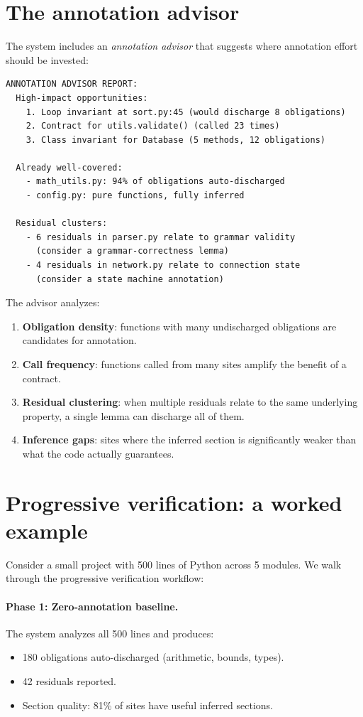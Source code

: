 \documentclass[11pt]{report}
\theoremstyle{definition}
\theoremstyle{plain}
\begin{document}
\section{The annotation advisor}

The system includes an \emph{annotation advisor} that suggests where
annotation effort should be invested:

\begin{lstlisting}[language={}]
ANNOTATION ADVISOR REPORT:
  High-impact opportunities:
    1. Loop invariant at sort.py:45 (would discharge 8 obligations)
    2. Contract for utils.validate() (called 23 times)
    3. Class invariant for Database (5 methods, 12 obligations)

  Already well-covered:
    - math_utils.py: 94% of obligations auto-discharged
    - config.py: pure functions, fully inferred

  Residual clusters:
    - 6 residuals in parser.py relate to grammar validity
      (consider a grammar-correctness lemma)
    - 4 residuals in network.py relate to connection state
      (consider a state machine annotation)
\end{lstlisting}

The advisor analyzes:
\begin{enumerate}[nosep]
  \item \textbf{Obligation density}: functions with many undischarged
        obligations are candidates for annotation.
  \item \textbf{Call frequency}: functions called from many sites amplify the
        benefit of a contract.
  \item \textbf{Residual clustering}: when multiple residuals relate to the
        same underlying property, a single lemma can discharge all of them.
  \item \textbf{Inference gaps}: sites where the inferred section is
        significantly weaker than what the code actually guarantees.
\end{enumerate}

\section{Progressive verification: a worked example}

Consider a small project with 500 lines of Python across 5 modules. We walk
through the progressive verification workflow:

\paragraph{Phase 1: Zero-annotation baseline.}
The system analyzes all 500 lines and produces:
\begin{itemize}[nosep]
  \item 180 obligations auto-discharged (arithmetic, bounds, types).
  \item 42 residuals reported.
  \item Section quality: 81\% of sites have useful inferred sections.
\end{itemize}
\end{document}

